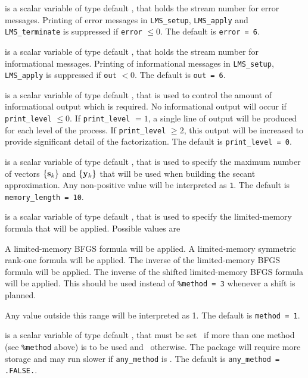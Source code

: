 \documentclass{galahad}
\newcommand{\packagename}{LMS}
\begin{document}
\begin{description}

 is a scalar variable of type default \integer, that holds the
stream number for error messages. Printing of error messages in
{\tt \packagename\_setup}, {\tt \packagename\_apply}
and {\tt \packagename\_terminate}
is suppressed if {\tt error} $\leq 0$.
The default is {\tt error = 6}.

 is a scalar variable of type default \integer, that holds the
stream number for informational messages. Printing of informational messages in
{\tt \packagename\_setup}, {\tt \packagename\_apply}
is suppressed if {\tt out} $< 0$.
The default is {\tt out = 6}.

 is a scalar variable of type default \integer, that is used
to control the amount of informational output which is required. No
informational output will occur if {\tt print\_level} $\leq 0$. If
{\tt print\_level} $= 1$, a single line of output will be produced for each
level of the process. If {\tt print\_level} $\geq 2$, this output will be
increased to provide significant detail of the factorization.
The default is {\tt print\_level = 0}.

 is a scalar variable of type default \integer, that is used
to specify the maximum number of vectors  $\{{\mathbf{s}}_k\}$ and $\{{\mathbf{y}}_k\}$
that will be used when building the secant approximation.
Any non-positive value will be interpreted as {\tt 1}.
The default is {\tt memory\_length = 10}.

 is a scalar variable of type default \integer, that is used
to specify the limited-memory formula that will be applied. Possible
values are
\begin{description}
 A limited-memory BFGS formula will be applied.
 A limited-memory symmetric rank-one formula will be applied.
 The inverse of the limited-memory BFGS formula will be applied.
 The inverse of the shifted limited-memory BFGS formula will be applied.
This should be used instead of {\tt \%method = 3} whenever a shift is
planned.
\end{description}
Any value outside this range will be interpreted as {1}.
The default is {\tt method = 1}.

 is a scalar variable of type default \logical,
that must be set \true\ if more than one method (see {\tt \%method} above)
is to be used and  \false\ otherwise. The package will require more
storage and may run slower if {\tt any\_method} is \true.
The default is {\tt any\_method = .FALSE.}.


\end{description}
\end{document}
